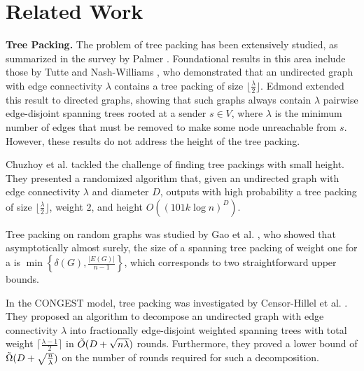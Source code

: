 \section{Related Work}
\textbf{Tree Packing.} The problem of tree packing has been extensively studied, as summarized in the survey by Palmer \cite{palmer2001spanning}. Foundational results in this area include those by Tutte \cite{tutte1961problem} and Nash-Williams \cite{nash1961edge}, who demonstrated that an undirected graph with edge connectivity $\lambda$ contains a tree packing of size $\lfloor \frac{\lambda}{2} \rfloor$. Edmond \cite{edmonds1972} extended this result to directed graphs, showing that such graphs always contain $\lambda$ pairwise edge-disjoint spanning trees rooted at a sender $s \in V$, where $\lambda$ is the minimum number of edges that must be removed to make some node unreachable from $s$. However, these results do not address the height of the tree packing.

    Chuzhoy et al. \cite{chuzhoy2020packing} tackled the challenge of finding tree packings with small height. They presented a randomized algorithm that, given an undirected graph with edge connectivity $\lambda$ and diameter $D$, outputs with high probability a tree packing of size $\lfloor \frac{\lambda}{2} \rfloor$, weight $2$, and height $O((101k \log n)^D)$.

    Tree packing on random graphs was studied by Gao et al. \cite{gao2014arboricity}, who showed that asymptotically almost surely, the size of a spanning tree packing of weight one for a {\graph} is $\min\left\{\delta(G), \frac{|E(G)|}{n - 1}\right\}$, which corresponds to two straightforward upper bounds.

    In the CONGEST model, tree packing was investigated by Censor-Hillel et al. \cite{censor2014distributed}. They proposed an algorithm to decompose an undirected graph with edge connectivity $\lambda$ into fractionally edge-disjoint weighted spanning trees with total weight $\lceil \frac{\lambda - 1}{2}\rceil$ in $\Tilde{O}(D + \sqrt{n\lambda})$ rounds. Furthermore, they proved a lower bound of $\Tilde{\Omega}(D + \sqrt{\frac{n}{\lambda}})$ on the number of rounds required for such a decomposition.

